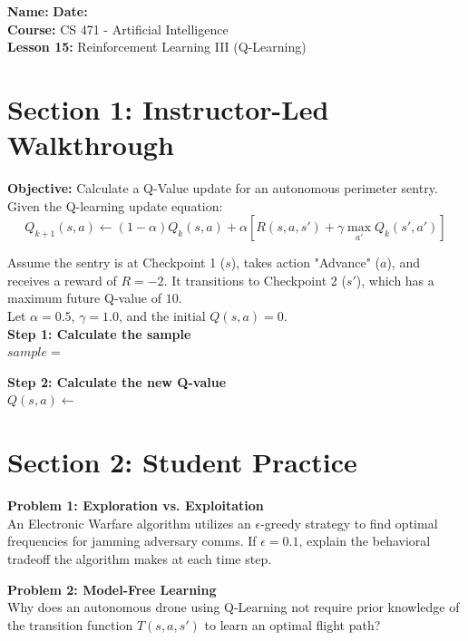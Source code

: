\documentclass[12pt]{article}
\begin{document}
\noindent
\textbf{Name:} \underline{\hspace{6cm}} \hfill \textbf{Date:} \underline{\hspace{4cm}} \\
\textbf{Course:} CS 471 - Artificial Intelligence \\
\textbf{Lesson 15:} Reinforcement Learning III (Q-Learning)

\vspace{1cm}

\section*{Section 1: Instructor-Led Walkthrough}
\textbf{Objective:} Calculate a Q-Value update for an autonomous perimeter sentry. \\

Given the Q-learning update equation:
\[ Q_{k+1}(s,a) \leftarrow (1-\alpha)Q_k(s,a) + \alpha \left[ R(s,a,s') + \gamma \max_{a'} Q_k(s',a') \right] \]

\noindent
Assume the sentry is at Checkpoint 1 ($s$), takes action "Advance" ($a$), and receives a reward of $R = -2$. It transitions to Checkpoint 2 ($s'$), which has a maximum future Q-value of $10$. \\
Let $\alpha = 0.5$, $\gamma = 1.0$, and the initial $Q(s,a) = 0$. \\

\noindent
\textbf{Step 1: Calculate the sample} \\
$sample = $

\vspace{2cm}

\noindent
\textbf{Step 2: Calculate the new Q-value} \\
$Q(s,a) \leftarrow $

\vspace{2cm}

\section*{Section 2: Student Practice}

\textbf{Problem 1: Exploration vs. Exploitation} \\
An Electronic Warfare algorithm utilizes an $\epsilon$-greedy strategy to find optimal frequencies for jamming adversary comms. If $\epsilon = 0.1$, explain the behavioral tradeoff the algorithm makes at each time step.

\vspace{4cm}

\textbf{Problem 2: Model-Free Learning} \\
Why does an autonomous drone using Q-Learning not require prior knowledge of the transition function $T(s,a,s')$ to learn an optimal flight path? 

\vspace{4cm}
\end{document}
